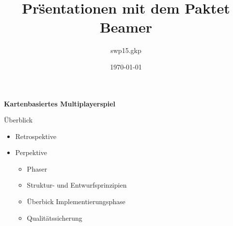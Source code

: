 \documentclass{beamer}
\title[SWT-Praktikum]{Pr\"sentationen mit dem Paktet  Beamer}
\author{swp15.gkp}
\date{\today{}}
\begin{document}
\begin{frame}
\center \huge \textbf{Kartenbasiertes Multiplayerspiel} \\
\end{frame}

\begin{frame}{Überblick}
\begin{itemize}
\item Retrospektive
\item Perpektive
\begin{itemize}
\item Phaser
\item Struktur- und Entwurfsprinzipien
\item Überbick Implementierungsphase
\item Qualitätssicherung
\end{itemize}
\end{itemize}
\end{frame}
\end{document}
